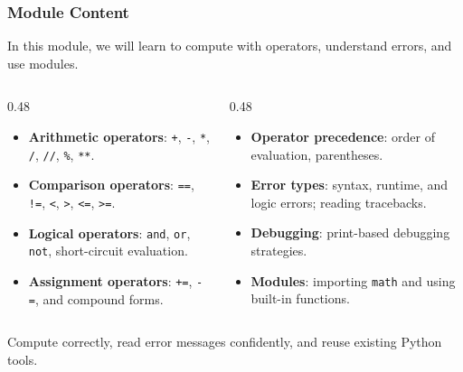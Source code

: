 \documentclass[aspectratio=169,10pt]{beamer}
\newcommand{\keyword}[1]{\textcolor{PrimaryBlue}{\textbf{#1}}}
\begin{document}
\begin{frame}[fragile]
\frametitle{Module Content}
\small
In this module, we will learn to compute with operators, understand errors, and use modules.

\vspace{0.18cm}
\begin{columns}[T,totalwidth=0.96\textwidth]
\begin{column}{0.48\textwidth}
\begin{itemize}\setlength\itemsep{0.05cm}
  \item \keyword{Arithmetic operators}: \texttt{+}, \texttt{-}, \texttt{*}, \texttt{/}, \texttt{//}, \texttt{\%}, \texttt{**}.
  \item \keyword{Comparison operators}: \texttt{==}, \texttt{!=}, \texttt{<}, \texttt{>}, \texttt{<=}, \texttt{>=}.
  \item \keyword{Logical operators}: \texttt{and}, \texttt{or}, \texttt{not}, short-circuit evaluation.
  \item \keyword{Assignment operators}: \texttt{+=}, \texttt{-=}, and compound forms.
\end{itemize}
\end{column}
\begin{column}{0.48\textwidth}
\begin{itemize}\setlength\itemsep{0.05cm}
  \item \keyword{Operator precedence}: order of evaluation, parentheses.
  \item \keyword{Error types}: syntax, runtime, and logic errors; reading tracebacks.
  \item \keyword{Debugging}: print-based debugging strategies.
  \item \keyword{Modules}: importing \texttt{math} and using built-in functions.
\end{itemize}
\end{column}
\end{columns}
\vspace{0.10cm}
\begin{tcolorbox}[lecturebox,title=Learning goal]
Compute correctly, read error messages confidently, and reuse existing Python tools.
\end{tcolorbox}
\end{frame}
\end{document}
